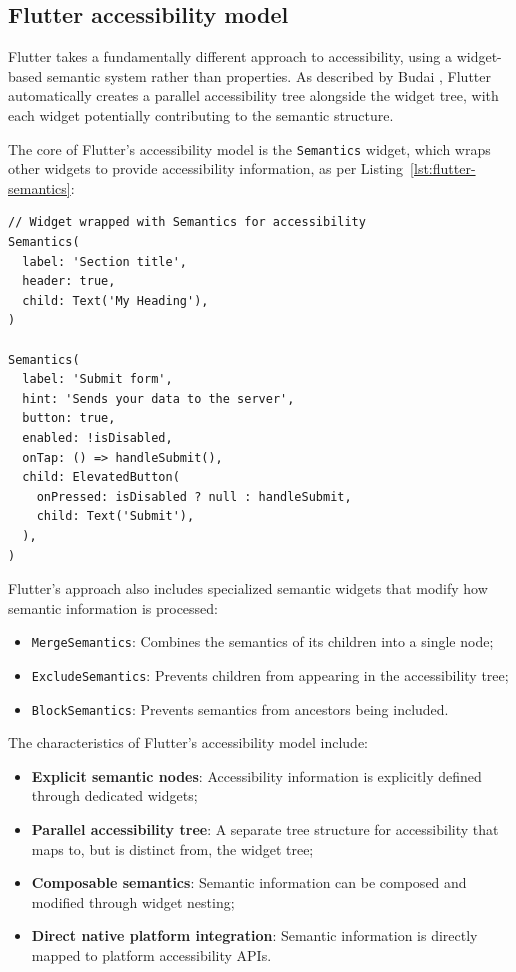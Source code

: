 \subsection{Flutter accessibility model}
Flutter takes a fundamentally different approach to accessibility, using a widget-based semantic system rather than properties. As described by Budai \cite{budai2024mobile}, Flutter automatically creates a parallel accessibility tree alongside the widget tree, with each widget potentially contributing to the semantic structure.

The core of Flutter's accessibility model is the \texttt{Semantics} widget, which wraps other widgets to provide accessibility information, as per Listing~\ref{lst:flutter-semantics}:

\begin{lstlisting}[style=DartStyle, caption=Flutter Semantics widget system, label=lst:flutter-semantics]
// Widget wrapped with Semantics for accessibility
Semantics(
  label: 'Section title',
  header: true,
  child: Text('My Heading'),
)

Semantics(
  label: 'Submit form',
  hint: 'Sends your data to the server',
  button: true,
  enabled: !isDisabled,
  onTap: () => handleSubmit(),
  child: ElevatedButton(
    onPressed: isDisabled ? null : handleSubmit,
    child: Text('Submit'),
  ),
)
\end{lstlisting}

Flutter's approach also includes specialized semantic widgets that modify how semantic information is processed:

\begin{itemize}
    \item \texttt{MergeSemantics}: Combines the semantics of its children into a single node;
    \item \texttt{ExcludeSemantics}: Prevents children from appearing in the accessibility tree;
    \item \texttt{BlockSemantics}: Prevents semantics from ancestors being included.
\end{itemize}

The characteristics of Flutter's accessibility model include:

\begin{itemize}
    \item \textbf{Explicit semantic nodes}: Accessibility information is explicitly defined through dedicated widgets;
    \item \textbf{Parallel accessibility tree}: A separate tree structure for accessibility that maps to, but is distinct from, the widget tree;
    \item \textbf{Composable semantics}: Semantic information can be composed and modified through widget nesting;
    \item \textbf{Direct native platform integration}: Semantic information is directly mapped to platform accessibility APIs.
\end{itemize}


